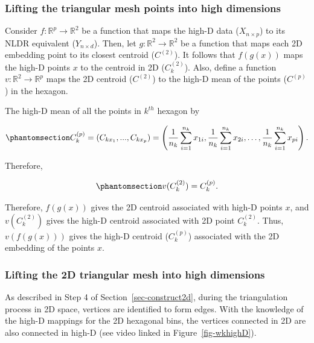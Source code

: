 \documentclass[
  12pt]{article}
\begin{document}
\subsubsection{Lifting the triangular mesh points into high
dimensions}\label{lifting-the-triangular-mesh-points-into-high-dimensions}

Consider \(f: \mathbb{R}^p \rightarrow \mathbb{R}^2\) be a function that
maps the high-D data (\(X_{n \times p}\)) to its NLDR equivalent
(\(Y_{n \times d}\)). Then, let
\(g: \mathbb{R}^2 \rightarrow \mathbb{R}^2\) be a function that maps
each 2D embedding point to its closest centroid (\(C^{(2)}\)). It
follows that \(f(g(x))\) maps the high-D points \(x\) to the centroid in
2D (\(C_k^{(2)}\)). Also, define a function
\(v: \mathbb{R}^2 \rightarrow \mathbb{R}^p\) maps the 2D centroid
(\(C^{(2)}\)) to the high-D mean of the points (\(C^{(p)}\)) in the
hexagon.

The high-D mean of all the points in \(k^{th}\) hexagon by

\begin{equation}\phantomsection\label{eq-equation6}{
C_k^{(p)} = (C_{kx_1}, ..., C_{kx_p}) = \left(\frac{1}{n_k} \sum_{i=1}^{n_k} x_{1i}, \frac{1}{n_k} \sum_{i=1}^{n_k} x_{2i}, \dots ,\frac{1}{n_k} \sum_{i=1}^{n_k} x_{pi}\right).
}\end{equation}

Therefore,

\begin{equation}\phantomsection\label{eq-equation7}{
v(C_k^{(2)}) = C_k^{(p)}.
}\end{equation}

Therefore, \(f(g(x))\) gives the 2D centroid associated with high-D
points \(x\), and \(v(C_k^{(2)})\) gives the high-D centroid associated
with 2D point \(C_k^{(2)}\). Thus, \(v(f(g(x)))\) gives the high-D
centroid (\(C_k^{(p)}\)) associated with the 2D embedding of the points
\(x\).

\subsubsection{Lifting the 2D triangular mesh into high
dimensions}\label{lifting-the-2d-triangular-mesh-into-high-dimensions}

As described in Step 4 of Section~\ref{sec-construct2d}, during the
triangulation process in 2D space, vertices are identified to form
edges. With the knowledge of the high-D mappings for the 2D hexagonal
bins, the vertices connected in 2D are also connected in high-D (see
video linked in Figure~\ref{fig-wkhighD}).
\end{document}
